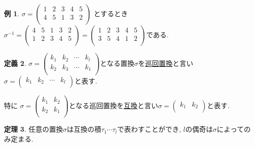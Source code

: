 \documentclass[dvipdfmx,a4paper,11pt]{article}
\theoremstyle{definition}
\newtheorem{thm}{定理}
\newtheorem{dfn}[thm]{定義}
\newtheorem{exa}[thm]{例}
\begin{document}
\begin{exa} 
$\sigma = 
\begin{pmatrix}
 1& 2  &3 & 4 & 5\\
 4& 5  &1  &3 &2\\
 \end{pmatrix} 
$
とするとき
$
\sigma^{-1}
=
\begin{pmatrix}
 4& 5  &1  &3 &2\\
 1& 2  &3 & 4 & 5\\
 \end{pmatrix} 
 =
 \begin{pmatrix}
 1& 2  &3 & 4 & 5\\
 3& 5  &4  &1 &2\\
 \end{pmatrix} 
 \text{である.}
$
\end{exa}

\begin{tcolorbox}[
    colback = white,
    colframe = green!35!black,
    fonttitle = \bfseries,
    breakable = true]
    \begin{dfn}
 $ \sigma =
  \begin{pmatrix}
 k_1& k_2  &\cdots &k_l\\
 k_2& k_3  &\cdots &k_1\\
 \end{pmatrix} 
$となる置換$\sigma$を\underline{巡回置換}と言い
$\sigma =
  \begin{pmatrix}
 k_1& k_2  &\cdots &k_l\\
 \end{pmatrix} 
$と表す.

特に $ \sigma =
  \begin{pmatrix}
 k_1& k_2  \\
 k_2& k_1 \\
 \end{pmatrix} 
$となる巡回置換を\underline{互換}と言い$\sigma =
  \begin{pmatrix}
 k_1& k_2 \\
 \end{pmatrix} 
$と表す.
  \end{dfn}
 \end{tcolorbox}


\begin{tcolorbox}[
    colback = white,
    colframe = green!35!black,
    fonttitle = \bfseries,
    breakable = true]
    \begin{thm}
任意の置換$\sigma$は互換の積$\tau_1 \cdots \tau_{l}$で表わすことができ, $l$の偶奇は$\sigma$によってのみ定まる.
  \end{thm}
 \end{tcolorbox}
 
\end{document}
